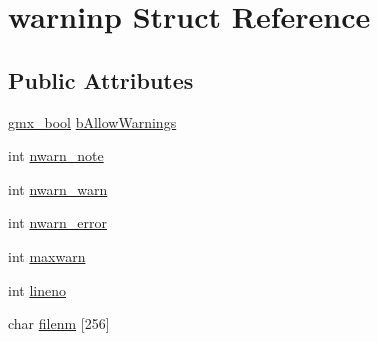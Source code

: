 \hypertarget{structwarninp}{\section{warninp \-Struct \-Reference}
\label{structwarninp}
}
\subsection*{\-Public \-Attributes}
\begin{DoxyCompactItemize}
\item 
\hyperlink{include_2types_2simple_8h_a8fddad319f226e856400d190198d5151}{gmx\-\_\-bool} \hyperlink{structwarninp_a21a7f5d9001c3641245afdc43831b628}{b\-Allow\-Warnings}
\item 
int \hyperlink{structwarninp_a9bd55035be4dcc956712af5f7e2df8fb}{nwarn\-\_\-note}
\item 
int \hyperlink{structwarninp_a98cea1623364e26576924677b3911e32}{nwarn\-\_\-warn}
\item 
int \hyperlink{structwarninp_aa4ce11f0389a5a68667a456876032f52}{nwarn\-\_\-error}
\item 
int \hyperlink{structwarninp_ae6d6db63024ed78edd77ad0f528a58ef}{maxwarn}
\item 
int \hyperlink{structwarninp_a5119c741ab1e79f44110cfce1a90e093}{lineno}
\item 
char \hyperlink{structwarninp_a0c90f686085a696797a05b254d3e837a}{filenm} \mbox{[}256\mbox{]}
\end{DoxyCompactItemize}


